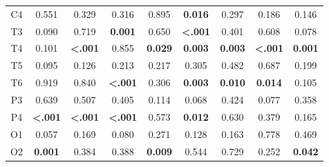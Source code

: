 \documentclass[pdflatex,sn-mathphys]{sn-jnl}%
\theoremstyle{thmstyleone}%
\theoremstyle{thmstyletwo}%
\theoremstyle{thmstylethree}%
\begin{document}
\begin{table}[h!]
{\begin{tabular}{ccccccccc}
C4                                   & 0.551                   & 0.329                   & 0.316                   & 0.895                   & \textbf{0.016}          & 0.297                   & 0.186                   & 0.146                       \\
T3                                   & 0.090                   & 0.719                   & \textbf{0.001}          & 0.650                   & \textbf{\textless .001} & 0.401                   & 0.608                   & 0.078                       \\
T4                                   & 0.101                   & \textbf{\textless .001} & 0.855                   & \textbf{0.029}          & \textbf{0.003}          & \textbf{0.003}          & \textbf{\textless .001} & \textbf{0.001}              \\
T5                                   & 0.095                   & 0.126                   & 0.213                   & 0.217                   & 0.305                   & 0.482                   & 0.687                   & 0.199                       \\
T6                                   & 0.919                   & 0.840                   & \textbf{\textless .001} & 0.306                   & \textbf{0.003}          & \textbf{0.010}          & \textbf{0.014}          & 0.105                       \\
P3                                   & 0.639                   & 0.507                   & 0.405                   & 0.114                   & 0.068                   & 0.424                   & 0.077                   & 0.358                       \\
P4                                   & \textbf{\textless .001} & \textbf{\textless .001} & \textbf{\textless .001} & 0.573                   & \textbf{0.012}          & 0.630                   & 0.379                   & 0.165                       \\
O1                                   & 0.057                   & 0.169                   & 0.080                   & 0.271                   & 0.128                   & 0.163                   & 0.778                   & 0.469                       \\
O2                                   & \textbf{0.001}          & 0.384                   & 0.388                   & \textbf{0.009}          & 0.544                   & 0.729                   & 0.252                   & \textbf{0.042}              \\ \hline
\end{tabular}} 
    \label{tab:featureselection1}
\end{table}
\end{document}
